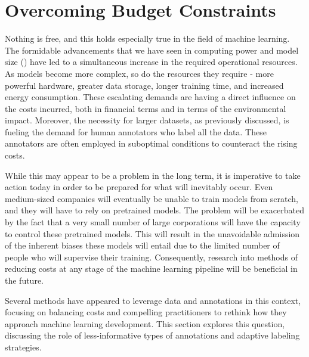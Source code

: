 \section{Overcoming Budget Constraints}
Nothing is free, and this holds especially true in the field of machine learning. The formidable advancements that we have seen in computing power and model size () have led to a simultaneous increase in the required operational resources. As models become more complex, so do the resources they require - more powerful hardware, greater data storage, longer training time, and increased energy consumption. These escalating demands are having a direct influence on the costs incurred, both in financial terms and in terms of the environmental impact. Moreover, the necessity for larger datasets, as previously discussed, is fueling the demand for human annotators who label all the data. These annotators are often employed in suboptimal conditions to counteract the rising costs.

While this may appear to be a problem in the long term, it is imperative to take action today in order to be prepared for what will inevitably occur. Even medium-sized companies will eventually be unable to train models from scratch, and they will have to rely on pretrained models. The problem will be exacerbated by the fact that a very small number of large corporations will have the capacity to control these pretrained models. This will result in the unavoidable admission of the inherent biases these models will entail due to the limited number of people who will supervise their training. Consequently, research into methods of reducing costs at any stage of the machine learning pipeline will be beneficial in the future.

Several methods have appeared to leverage data and annotations in this context, focusing on balancing costs and compelling practitioners to rethink how they approach machine learning development. This section explores this question, discussing the role of less-informative types of annotations and adaptive labeling strategies.

